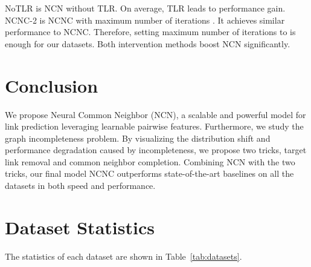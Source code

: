 \documentclass{article}
\theoremstyle{plain}
\theoremstyle{definition}
\theoremstyle{remark}
\begin{document}
NoTLR is NCN without TLR. On average, TLR leads to  performance gain. NCNC-2 is NCNC with maximum number of iterations . It achieves similar performance to NCNC. Therefore, setting maximum number of iterations to  is enough for our datasets. Both intervention methods boost NCN significantly.

\section{Conclusion}
We propose Neural Common Neighbor (NCN), a scalable and powerful model for link prediction leveraging learnable pairwise features. Furthermore, we study the graph incompleteness problem. By visualizing the  distribution shift and performance degradation caused by incompleteness, we propose two tricks, target link removal and common neighbor completion. Combining NCN with the two tricks, our final model NCNC outperforms state-of-the-art baselines on all the datasets in both speed and performance. 

\newpage




\newpage
\appendix
\onecolumn
\section{Dataset Statistics}\label{app:data}
The statistics of each dataset are shown in Table~\ref{tab:datasets}.
\end{document}
